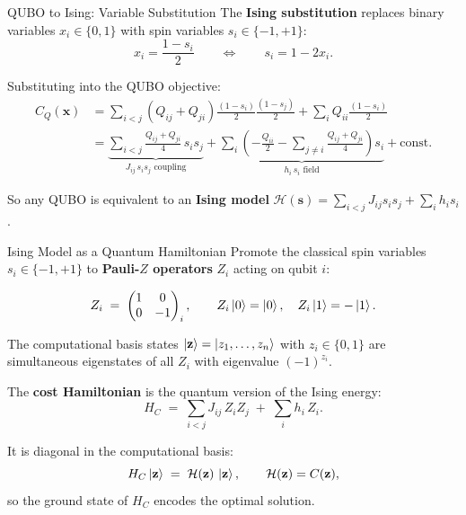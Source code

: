 \documentclass{beamer}
\begin{document}

\begin{frame}{QUBO to Ising: Variable Substitution}
The \textbf{Ising substitution} replaces binary variables
$x_i\in\{0,1\}$ with spin variables $s_i\in\{-1,+1\}$:
\[
x_i = \frac{1 - s_i}{2}
\qquad\Longleftrightarrow\qquad
s_i = 1 - 2x_i.
\]

Substituting into the QUBO objective:
\begin{align*}
C_Q(\mathbf{x})
&= \sum_{i<j}(Q_{ij}+Q_{ji})
   \frac{(1-s_i)}{2}\frac{(1-s_j)}{2}
   + \sum_i Q_{ii}\frac{(1-s_i)}{2}\\[4pt]
&= \underbrace{\sum_{i<j} \frac{Q_{ij}+Q_{ji}}{4}\,s_i s_j}_{J_{ij}\,s_i s_j\text{ coupling}}
   + \underbrace{\sum_i \left(-\frac{Q_{ii}}{2}
   - \sum_{j\neq i}\frac{Q_{ij}+Q_{ji}}{4}\right)s_i}_{h_i\,s_i\text{ field}}
   + \text{const.}
\end{align*}

So any QUBO is equivalent to an \textbf{Ising model}
$\mathcal{H}(\mathbf{s}) = \sum_{i<j}J_{ij}s_is_j + \sum_i h_i s_i$.
\end{frame}


\begin{frame}{Ising Model as a Quantum Hamiltonian}
Promote the classical spin variables $s_i\in\{-1,+1\}$ to
\textbf{Pauli-$Z$ operators} $Z_i$ acting on qubit $i$:

\[
Z_i \;=\; \begin{pmatrix}1&0\\0&-1\end{pmatrix}_i,\qquad
Z_i\ket{0} = \ket{0},\quad Z_i\ket{1}=-\ket{1}.
\]

The computational basis states $\ket{\mathbf{z}} =
\ket{z_1,\dots,z_n}$ with $z_i\in\{0,1\}$ are simultaneous
eigenstates of all $Z_i$ with eigenvalue $(-1)^{z_i}$.

\medskip

The \textbf{cost Hamiltonian} is the quantum version of the Ising energy:
\[
\boxed{
H_C \;=\; \sum_{i<j} J_{ij}\,Z_i Z_j \;+\; \sum_i h_i\,Z_i.}
\]

It is diagonal in the computational basis:
\[
H_C\ket{\mathbf{z}} \;=\; \mathcal{H}(\mathbf{z})\,\ket{\mathbf{z}},
\qquad \mathcal{H}(\mathbf{z}) = C(\mathbf{z}),
\]
so the ground state of $H_C$ encodes the optimal solution.
\end{frame}

\end{document}
